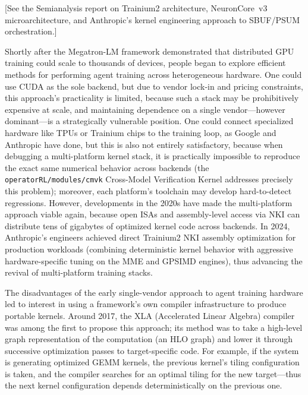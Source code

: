 \documentclass[12pt]{article}
\newcommand{\SBUF}{\textsc{SBUF}}                 %
\newcommand{\PSUM}{\textsc{PSUM}}                 %
\newcommand{\MME}{\textsc{MME}}                   %
\newcommand{\GPSIMD}{\textsc{GPSIMD}}             %
\begin{document}
[See the Semianalysis report \citep{semianalysis2024trainium2} on Trainium2 architecture, NeuronCore~v3 microarchitecture, and Anthropic's kernel engineering approach to \SBUF{}/\PSUM{} orchestration.]

\bigskip

Shortly after the Megatron-LM framework demonstrated that distributed GPU training could scale to thousands of devices, people began to explore efficient methods for performing agent training across heterogeneous hardware. One could use CUDA as the sole backend, but due to vendor lock-in and pricing constraints, this approach's practicality is limited, because such a stack may be prohibitively expensive at scale, and maintaining dependence on a single vendor---however dominant---is a strategically vulnerable position. One could connect specialized hardware like TPUs or Trainium chips to the training loop, as Google and Anthropic have done, but this is also not entirely satisfactory, because when debugging a multi-platform kernel stack, it is practically impossible to reproduce the exact same numerical behavior across backends (the \texttt{operatorRL/modules/cmvk} Cross-Model Verification Kernel addresses precisely this problem); moreover, each platform's toolchain may develop hard-to-detect regressions. However, developments in the 2020s have made the multi-platform approach viable again, because open ISAs and assembly-level access via NKI can distribute tens of gigabytes of optimized kernel code across backends. In 2024, Anthropic's engineers achieved direct Trainium2 NKI assembly optimization for production workloads (combining deterministic kernel behavior with aggressive hardware-specific tuning on the \MME{} and \GPSIMD{} engines), thus advancing the revival of multi-platform training stacks.

The disadvantages of the early single-vendor approach to agent training hardware led to interest in using a framework's own compiler infrastructure to produce portable kernels. Around 2017, the XLA (Accelerated Linear Algebra) compiler was among the first to propose this approach; its method was to take a high-level graph representation of the computation (an HLO graph) and lower it through successive optimization passes to target-specific code. For example, if the system is generating optimized GEMM kernels, the previous kernel's tiling configuration is taken, and the compiler searches for an optimal tiling for the new target---thus the next kernel configuration depends deterministically on the previous one.
\end{document}
